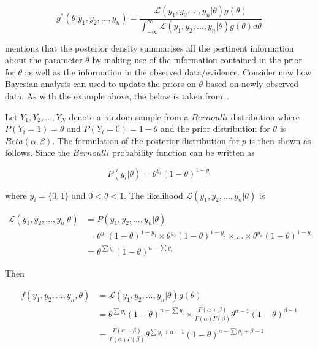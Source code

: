 \begin{equation}
      \label{eq:probability:bayesian_statistic:bayesian_analysis:posterior_density}
      g^{*}(\theta \vert y_{1}, y_{2}, \dots, y_{n}) = \frac{\mathcal{L}(y_{1}, y_{2}, \dots, y_{n} \vert \theta)g(\theta)}{\int_{-\infty}^{\infty} \mathcal{L}(y_{1}, y_{2}, \dots, y_{n} \vert \theta)g(\theta)d\theta}
\end{equation}

\citeauthor{ref:wackerly:2014}\cite{ref:wackerly:2014} mentions that the posterior density summarises all the pertinent information about the parameter $\theta$ by making use of the information contained in the prior for $\theta$ as well as the information in the observed data/evidence. Consider now how Bayesian analysis can used to update the priors on $\theta$ based on newly observed data. As with the example above, the below is taken from~\cite{ref:wackerly:2014}.

Let $Y_{1}, Y_{2}, \dots, Y_{N}$ denote a random sample from a $Bernoulli$ distribution where $P(Y_{i} = 1) = \theta$ and $P(Y_{i} = 0) = 1 - \theta$ and the prior distribution for $\theta$ is $Beta(\alpha, \beta)$. The formulation of the posterior distribution for $p$ is then shown as follows. Since the $Bernoulli$ probability function can be written as

\begin{equation*}
      P(y_{i} \vert \theta) = \theta^{y_{i}}(1 - \theta)^{1-y_{i}}
\end{equation*}

where $y_{i} = \{0,1\}$ and $0 < \theta < 1$. The likelihood $\mathcal{L}(y_{1}, y_{2}, \dots, y_{n} \vert \theta)$ is

\begin{equation*}
      \begin{split}
            \mathcal{L}(y_{1}, y_{2}, \dots, y_{n} \vert \theta)
            &= P(y_{1}, y_{2}, \dots, y_{n} \vert \theta)\\
            &= \theta^{y_{1}}(1-\theta)^{1 - y_{1}} \times \theta^{y_{2}}(1-\theta)^{1 - y_{2}} \times \dots \times \theta^{y_{n}}(1-\theta)^{1 - y_{n}}\\
            &= \theta^{\sum y_{i}}(1-\theta)^{n-\sum y_{i}}
      \end{split}
\end{equation*}

Then

\begin{equation*}
      \begin{split}
            f(y_{1}, y_{2}, \dots, y_{n}, \theta)
            &= \mathcal{L}(y_{1}, y_{2}, \dots, y_{n} \vert \theta)g(\theta)\\
            &= \theta^{\sum y_{i}}(1-\theta)^{n-\sum y_{i}} \times \frac{\Gamma(\alpha + \beta)}{\Gamma(\alpha)\Gamma(\beta)}\theta^{\alpha - 1}(1 - \theta)^{\beta  - 1}\\
            &= \frac{\Gamma(\alpha + \beta)}{\Gamma(\alpha)\Gamma(\beta)}\theta^{\sum y_{i} + \alpha - 1}(1-\theta)^{n - \sum y_{i} + \beta - 1}
      \end{split}
\end{equation*}

